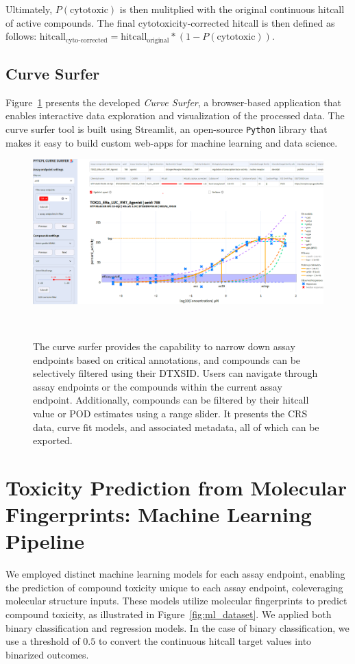 Ultimately, $P(\text{cytotoxic})$ is then mulitplied with the original continuous hitcall of active compounds. The final cytotoxicity-corrected hitcall is then defined as follows: $\text{hitcall}_{\text{cyto-corrected}} = \text{hitcall}_{\text{original}} * (1 - P(\text{cytotoxic}))$.

\subsection{Curve Surfer}
Figure~\ref{fig:curve_surfer} presents the developed \emph{Curve Surfer}, a browser-based application that enables interactive data exploration and visualization of the processed data. The curve surfer tool is built using Streamlit, an open-source \texttt{Python} library that makes it easy to build custom web-apps for machine learning and data science. 


\begin{figure}[h]
    \centering
    \includegraphics[width=1.0\textwidth]{figures/curve_surfer.png}
    \caption{The curve surfer provides the capability to narrow down assay endpoints based on critical annotations, and compounds can be selectively filtered using their DTXSID. Users can navigate through assay endpoints or the compounds within the current assay endpoint. Additionally, compounds can be filtered by their hitcall value or POD estimates using a range slider. It presents the CRS data, curve fit models, and associated metadata, all of which can be exported.}
~\label{fig:curve_surfer}
\end{figure}


\section{Toxicity Prediction from Molecular Fingerprints: Machine Learning Pipeline}
We employed distinct machine learning models for each assay endpoint, enabling the prediction of compound toxicity unique to each assay endpoint, coleveraging molecular structure inputs.
These models utilize molecular fingerprints to predict compound toxicity, as illustrated in Figure~\ref{fig:ml_dataset}. We applied both binary classification and regression models. In the case of binary classification, we use a threshold of $0.5$ to convert the continuous hitcall target values into binarized outcomes.

